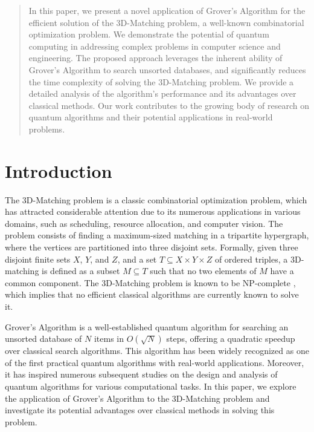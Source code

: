 \begin{abstract}
In this paper, we present a novel application of Grover's Algorithm for the efficient solution of the 3D-Matching problem, a well-known combinatorial optimization problem. We demonstrate the potential of quantum computing in addressing complex problems in computer science and engineering. The proposed approach leverages the inherent ability of Grover's Algorithm to search unsorted databases, and significantly reduces the time complexity of solving the 3D-Matching problem. We provide a detailed analysis of the algorithm's performance and its advantages over classical methods. Our work contributes to the growing body of research on quantum algorithms and their potential applications in real-world problems.
\end{abstract}

\section{Introduction}

The 3D-Matching problem is a classic combinatorial optimization problem, which has attracted considerable attention due to its numerous applications in various domains, such as scheduling, resource allocation, and computer vision. The problem consists of finding a maximum-sized matching in a tripartite hypergraph, where the vertices are partitioned into three disjoint sets. Formally, given three disjoint finite sets $X$, $Y$, and $Z$, and a set $T \subseteq X \times Y \times Z$ of ordered triples, a 3D-matching is defined as a subset $M \subseteq T$ such that no two elements of $M$ have a common component. The 3D-Matching problem is known to be NP-complete \cite{garey1979computers}, which implies that no efficient classical algorithms are currently known to solve it.

Grover's Algorithm \cite{grover1996fast} is a well-established quantum algorithm for searching an unsorted database of $N$ items in $O(\sqrt{N})$ steps, offering a quadratic speedup over classical search algorithms. This algorithm has been widely recognized as one of the first practical quantum algorithms with real-world applications. Moreover, it has inspired numerous subsequent studies on the design and analysis of quantum algorithms for various computational tasks. In this paper, we explore the application of Grover's Algorithm to the 3D-Matching problem and investigate its potential advantages over classical methods in solving this problem.

